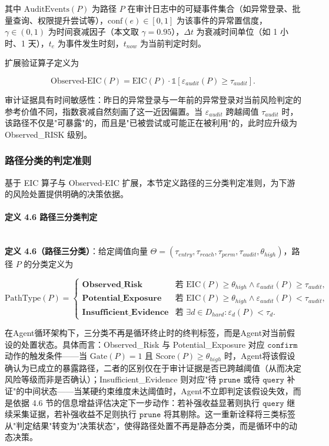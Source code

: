 \documentclass[a4paper,12pt]{ctexart}
\begin{document}
其中 $\text{AuditEvents}(P)$ 为路径 $P$ 在审计日志中的可疑事件集合（如异常登录、批量查询、权限提升尝试等），$\text{conf}(e) \in [0,1]$ 为该事件的异常置信度，$\gamma \in (0,1)$ 为时间衰减因子（本文取 $\gamma = 0.95$），$\Delta t$ 为衰减时间单位（如 1 小时、1 天），$t_e$ 为事件发生时刻，$t_{now}$ 为当前判定时刻。

扩展验证算子定义为

\[
\text{Observed-EIC}(P) = \text{EIC}(P) \cdot \mathbb{1}\!\left[\varepsilon_{audit}(P) \geq \tau_{audit}\right].
\]

审计证据具有时间敏感性：昨日的异常登录与一年前的异常登录对当前风险判定的参考价值不同，指数衰减自然刻画了这一近因偏置。当 $\varepsilon_{audit}$ 跨越阈值 $\tau_{audit}$ 时，该路径不仅是"可暴露"的，而且是"已被尝试或可能正在被利用"的，此时应升级为 Observed\_RISK 级别。

\subsubsection{路径分类的判定准则}

基于 EIC 算子与 Observed-EIC 扩展，本节定义路径的三分类判定准则，为下游的风险处置提供明确的决策依据。

\paragraph{定义 4.6 路径三分类判定}\mbox{}\\

\textbf{定义 4.6（路径三分类）}：给定阈值向量 $\Theta = (\tau_{entry}, \tau_{reach}, \tau_{perm}, \tau_{audit}, \theta_{high})$，路径 $P$ 的分类定义为

\[
\text{PathType}(P) = \begin{cases}
\textbf{Observed\_Risk} & \text{若 } \text{EIC}(P) \geq \theta_{high} \wedge \varepsilon_{audit}(P) \geq \tau_{audit}, \\[2pt]
\textbf{Potential\_Exposure} & \text{若 } \text{EIC}(P) \geq \theta_{high} \wedge \varepsilon_{audit}(P) < \tau_{audit}, \\[2pt]
\textbf{Insufficient\_Evidence} & \text{若 } \exists d \in D_{hard}: \varepsilon_d(P) < \tau_d.
\end{cases}
\]

在Agent循环架构下，三分类不再是循环终止时的终判标签，而是Agent对当前假设的处置状态。具体而言：Observed\_Risk 与 Potential\_Exposure 对应 $\texttt{confirm}$ 动作的触发条件——当 $\text{Gate}(P)=1$ 且 $\text{Score}(P) \geq \theta_{high}$ 时，Agent将该假设确认为已成立的暴露路径，二者的区别仅在于审计证据是否已跨越阈值（从而决定风险等级而非是否确认）；Insufficient\_Evidence 则对应"待 $\texttt{prune}$ 或待 $\texttt{query}$ 补证"的中间状态——当某硬约束维度未达阈值时，Agent不立即判定该假设失效，而是依据 4.6 节的信息增益评估决定下一步动作：若补强收益显著则执行 $\texttt{query}$ 继续采集证据，若补强收益不足则执行 $\texttt{prune}$ 将其剔除。这一重新诠释将三类标签从"判定结果"转变为"决策状态"，使得路径处置不再是静态分类，而是循环中的动态决策。
\end{document}
